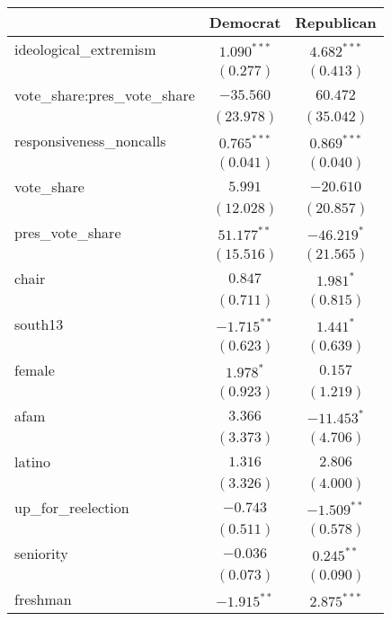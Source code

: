 \documentclass[12pt]{article}
\begin{document}
\begin{table}
	\begin{center}
		\begin{tabular}{l c c }
			\hline
			& Democrat & Republican \\
			\hline
			ideological\_extremism        & $1.090^{***}$ & $4.682^{***}$ \\
			& $(0.277)$     & $(0.413)$     \\
			vote\_share:pres\_vote\_share & $-35.560$     & $60.472$      \\
			& $(23.978)$    & $(35.042)$    \\
			responsiveness\_noncalls      & $0.765^{***}$ & $0.869^{***}$ \\
			& $(0.041)$     & $(0.040)$     \\
			vote\_share                   & $5.991$       & $-20.610$     \\
			& $(12.028)$    & $(20.857)$    \\
			pres\_vote\_share             & $51.177^{**}$ & $-46.219^{*}$ \\
			& $(15.516)$    & $(21.565)$    \\
			chair                         & $0.847$       & $1.981^{*}$   \\
			& $(0.711)$     & $(0.815)$     \\
			south13                       & $-1.715^{**}$ & $1.441^{*}$   \\
			& $(0.623)$     & $(0.639)$     \\
			female                        & $1.978^{*}$   & $0.157$       \\
			& $(0.923)$     & $(1.219)$     \\
			afam                          & $3.366$       & $-11.453^{*}$ \\
			& $(3.373)$     & $(4.706)$     \\
			latino                        & $1.316$       & $2.806$       \\
			& $(3.326)$     & $(4.000)$     \\
			up\_for\_reelection           & $-0.743$      & $-1.509^{**}$ \\
			& $(0.511)$     & $(0.578)$     \\
			seniority                     & $-0.036$      & $0.245^{**}$  \\
			& $(0.073)$     & $(0.090)$     \\
			freshman                      & $-1.915^{**}$ & $2.875^{***}$ \\

\end{tabular}
\end{center}
\end{table}
\end{document}
